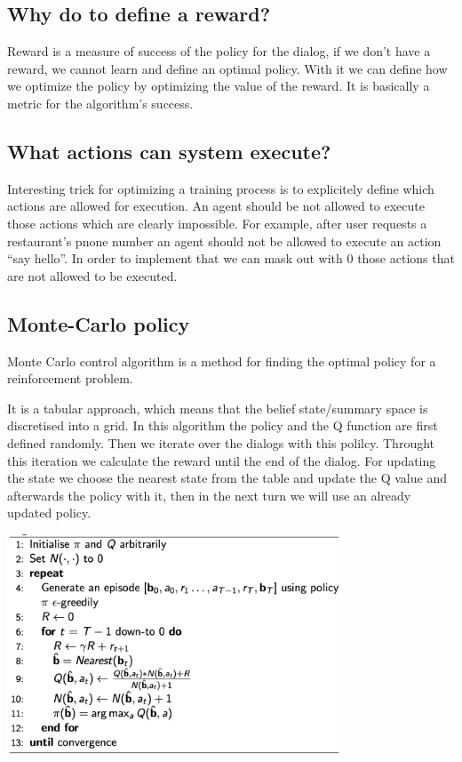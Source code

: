 \documentclass[12pt,titlepage,a4paper]{article}
\begin{document}
\subsection{Why do to define a reward?}

Reward is a measure of success of the policy for the dialog, if we don’t have a reward, we cannot learn and define an optimal policy. With it we can define how we optimize the policy by optimizing the value of the reward. It is basically a metric for the algorithm's success.

\subsection{What actions can system execute?}

Interesting trick for optimizing a training process is to explicitely define which actions are allowed for execution. An agent should be not allowed to execute those actions which are clearly impossible. For example, after user requests a restaurant's pnone number an agent should not be allowed to execute an action “say hello”. In order to implement that we can mask out with 0 those actions that are not allowed to be executed.

\subsection{Monte-Carlo policy}

Monte Carlo control algorithm is a method for finding the optimal policy for a reinforcement problem.

It is a tabular approach, which means that the belief state/summary space is discretised into a grid. In this algorithm the policy and the Q function are first defined randomly. Then we iterate over the dialogs with this polilcy. Throught this iteration we calculate the reward until the end of the dialog. For updating the state we choose the nearest state from the table and update the Q value and afterwards the policy with it, then in the next turn we will use an already updated policy. 

\begin{center}
    \includegraphics[width=10cm]{MCC.png}
\end{center}
\end{document}
